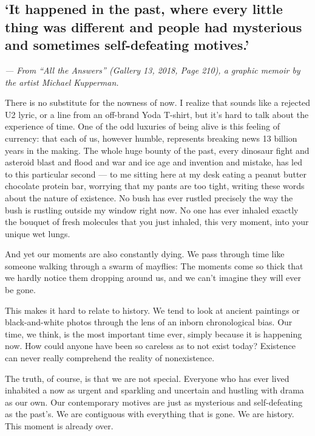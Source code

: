 \hypertarget{it-happened-in-the-past-where-every-little-thing-was-different-and-people-had-mysterious-and-sometimes-self-defeating-motives}{%
\subsection{`It happened in the past, where every little thing was
different and people had mysterious and sometimes self-defeating
motives.'}\label{it-happened-in-the-past-where-every-little-thing-was-different-and-people-had-mysterious-and-sometimes-self-defeating-motives}}

\emph{--- From ``All the Answers'' (Gallery 13, 2018, Page 210), a
graphic memoir by the artist Michael Kupperman.}

There is no substitute for the nowness of now. I realize that sounds
like a rejected U2 lyric, or a line from an off-brand Yoda T-shirt, but
it's hard to talk about the experience of time. One of the odd luxuries
of being alive is this feeling of currency: that each of us, however
humble, represents breaking news 13 billion years in the making. The
whole huge bounty of the past, every dinosaur fight and asteroid blast
and flood and war and ice age and invention and mistake, has led to this
particular second --- to me sitting here at my desk eating a peanut
butter chocolate protein bar, worrying that my pants are too tight,
writing these words about the nature of existence. No bush has ever
rustled precisely the way the bush is rustling outside my window right
now. No one has ever inhaled exactly the bouquet of fresh molecules that
you just inhaled, this very moment, into your unique wet lungs.

And yet our moments are also constantly dying. We pass through time like
someone walking through a swarm of mayflies: The moments come so thick
that we hardly notice them dropping around us, and we can't imagine they
will ever be gone.

This makes it hard to relate to history. We tend to look at ancient
paintings or black-and-white photos through the lens of an inborn
chronological bias. Our time, we think, is the most important time ever,
simply because it is happening now. How could anyone have been so
careless as to not exist today? Existence can never really comprehend
the reality of nonexistence.

The truth, of course, is that we are not special. Everyone who has ever
lived inhabited a now as urgent and sparkling and uncertain and hustling
with drama as our own. Our contemporary motives are just as mysterious
and self-defeating as the past's. We are contiguous with everything that
is gone. We are history. This moment is already over.

